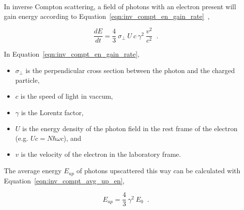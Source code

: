   In inverse Compton scattering, a field of photons with an electron present will gain energy according to Equation~\ref{eqn:inv_compt_en_gain_rate}~\cite{inv_compt1,inv_compt2},
  
  \begin{equation}\label{eqn:inv_compt_en_gain_rate}
    \frac{dE}{dt} = \frac{4}{3} \: \sigma_{\perp} \: U \: c \: \gamma^2 \: \frac{ v^2 }{ c^2 } \;\; .
  \end{equation}

  In Equation~\ref{eqn:inv_compt_en_gain_rate}, 
  \begin{itemize}
    \item $\sigma_{\perp}$ is the perpendicular cross section between the photon and the charged particle, 
    \item $c$ is the speed of light in vaccum,
    \item $\gamma$ is the Lorentz factor,
    \item $U$ is the energy density of the photon field in the rest frame of the electron (e.g. $Uc=N\hbar \omega c$), and 
    \item $v$ is the velocity of the electron in the laboratory frame.
  \end{itemize}

  The average energy $E_{up}$ of photons upscattered this way can be calculated with Equation~\ref{eqn:inv_compt_avg_up_en},
  
  \begin{equation}\label{eqn:inv_compt_avg_up_en}
    E_{up} = \frac{4}{3} \: \gamma^2 \: E_{0} \;\;.
  \end{equation}
  
  
  
  
  
